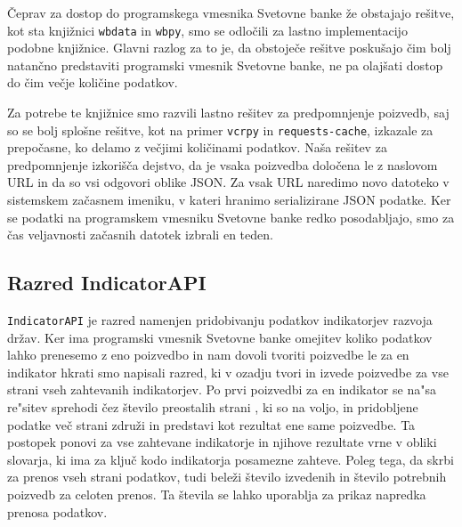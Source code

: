Čeprav za dostop do programskega vmesnika Svetovne banke že obstajajo 
rešitve, kot sta knjižnici 
\verb|wbdata| in
\verb|wbpy|, smo se odločili
za lastno implementacijo podobne knjižnice. Glavni razlog za to je, da
obstoječe rešitve poskušajo čim bolj natančno predstaviti programski
vmesnik Svetovne banke, ne pa olajšati dostop do čim večje količine
podatkov.

Za potrebe te knjižnice smo razvili lastno rešitev za predpomnjenje poizvedb,
saj so se bolj splošne rešitve, kot na primer
\verb|vcrpy| in
\verb|requests-cache|,
izkazale za prepočasne, ko delamo z večjimi količinami podatkov. Naša
rešitev za predpomnjenje izkorišča dejstvo, da je vsaka poizvedba določena le
z naslovom URL in da so vsi odgovori oblike JSON. Za vsak URL naredimo novo
datoteko v sistemskem začasnem imeniku, v kateri hranimo serializirane JSON
podatke. Ker se podatki na programskem vmesniku Svetovne banke redko
posodabljajo, smo za čas veljavnosti začasnih datotek izbrali en teden.



\subsection{Razred IndicatorAPI}
\label{razered_indicator_api}

\verb|IndicatorAPI| je razred namenjen pridobivanju podatkov indikatorjev
razvoja držav. Ker ima programski vmesnik Svetovne banke omejitev koliko 
podatkov lahko prenesemo z eno poizvedbo in nam dovoli tvoriti poizvedbe le za
en indikator hkrati smo napisali razred, ki v ozadju tvori in izvede
poizvedbe za vse strani vseh zahtevanih indikatorjev. Po
prvi poizvedbi za en indikator se na"sa re"sitev sprehodi čez število preostalih strani 
, ki so na voljo, in pridobljene podatke več
strani združi in predstavi kot rezultat ene same poizvedbe. Ta postopek ponovi
za vse zahtevane indikatorje in njihove rezultate vrne v obliki slovarja, ki 
ima za ključ kodo indikatorja posamezne zahteve.
Poleg tega, da skrbi za prenos vseh strani podatkov, tudi beleži število 
izvedenih in število potrebnih poizvedb za celoten prenos. Ta števila se
lahko uporablja za prikaz napredka prenosa podatkov.


